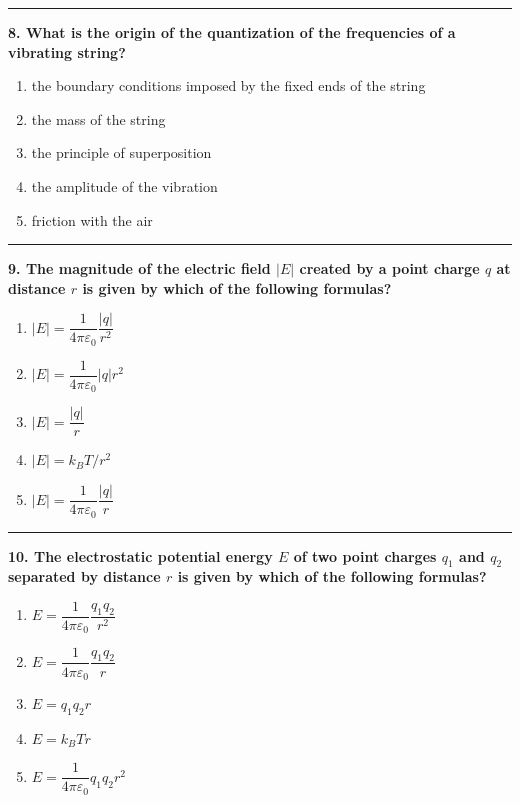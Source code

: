 \documentclass[
  english,
  9pt,
]{extbook}
\providecommand{\tightlist}{%
  \setlength{\itemsep}{0pt}\setlength{\parskip}{0pt}}
\theoremstyle{definition}
\theoremstyle{definition}
\theoremstyle{definition}
\theoremstyle{definition}
\theoremstyle{remark}
\begin{document}
\begin{center}\rule{0.5\linewidth}{0.5pt}\end{center}

\textbf{8. What is the origin of the quantization of the frequencies of a vibrating string?}

\begin{enumerate}
\def\labelenumi{\alph{enumi}.}
\tightlist
\item
  the boundary conditions imposed by the fixed ends of the string\\
\item
  the mass of the string\\
\item
  the principle of superposition\\
\item
  the amplitude of the vibration\\
\item
  friction with the air
\end{enumerate}

\begin{center}\rule{0.5\linewidth}{0.5pt}\end{center}

\textbf{9. The magnitude of the electric field \(|E|\) created by a point charge \(q\) at distance \(r\) is given by which of the following formulas?}

\begin{enumerate}
\def\labelenumi{\alph{enumi}.}
\tightlist
\item
  \(|E| = \dfrac{1}{4\pi \varepsilon_0} \dfrac{|q|}{r^2}\)
\item
  \(|E| = \dfrac{1}{4\pi \varepsilon_0} |q| r^2\)
\item
  \(|E| = \dfrac{|q|}{r}\)
\item
  \(|E| = k_B T / r^2\)
\item
  \(|E| = \dfrac{1}{4\pi \varepsilon_0} \dfrac{|q|}{r}\)
\end{enumerate}

\begin{center}\rule{0.5\linewidth}{0.5pt}\end{center}

\textbf{10. The electrostatic potential energy \(E\) of two point charges \(q_1\) and \(q_2\) separated by distance \(r\) is given by which of the following formulas?}

\begin{enumerate}
\def\labelenumi{\alph{enumi}.}
\tightlist
\item
  \(E = \dfrac{1}{4\pi \varepsilon_0} \dfrac{q_1 q_2}{r^2}\)
\item
  \(E = \dfrac{1}{4\pi \varepsilon_0} \dfrac{q_1 q_2}{r}\)
\item
  \(E = q_1 q_2 r\)
\item
  \(E = k_B T r\)
\item
  \(E = \dfrac{1}{4\pi \varepsilon_0} q_1 q_2 r^2\)
\end{enumerate}
\end{document}
